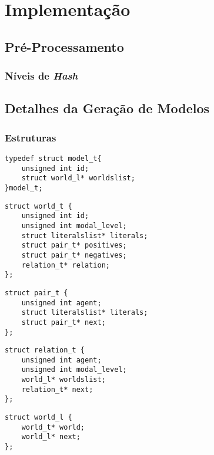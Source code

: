 \chapter{Implementação}

\section{Pré-Processamento}
\label{sec:pré-processamento}

\subsection{Níveis de \textit{Hash}}
\label{sub:n_veis_de_hash}


\section{Detalhes da Geração de Modelos}
\subsection{Estruturas}
\label{subsec:estruturas}


\begin{lstlisting}[frame=single]
typedef struct model_t{ 
    unsigned int id;
    struct world_l* worldslist;
}model_t;
\end{lstlisting}

\begin{lstlisting}[frame=single]
struct world_t {
    unsigned int id;
    unsigned int modal_level;
    struct literalslist* literals;
    struct pair_t* positives;
    struct pair_t* negatives;
    relation_t* relation;
};
\end{lstlisting}

\begin{lstlisting}[frame=single]
struct pair_t {
    unsigned int agent;
    struct literalslist* literals;
    struct pair_t* next;
};
\end{lstlisting}

\begin{lstlisting}[frame=single]
struct relation_t {
    unsigned int agent;
    unsigned int modal_level;
    world_l* worldslist;
    relation_t* next;
};
\end{lstlisting}

\begin{lstlisting}[frame=single]
struct world_l {
    world_t* world;
    world_l* next;
};
\end{lstlisting}

